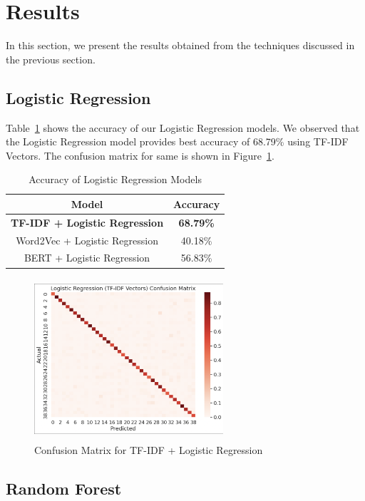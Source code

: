 \documentclass[conference]{IEEEtran}
\begin{document}
\section{Results}
In this section, we present the results obtained from the techniques discussed in the previous section.

\subsection{Logistic Regression}
Table~\ref{tab: lr_models} shows the accuracy of our Logistic Regression models. We observed that the Logistic Regression model provides best accuracy of 68.79\% using TF-IDF Vectors. The confusion matrix for same is shown in Figure~\ref{fig:lr}.

\begin{table}[!htb]
\centering
\caption{Accuracy of Logistic Regression Models}
\label{tab: lr_models}
\begin{tabular}{c|c}\midrule\midrule
Model & Accuracy\\ \midrule
\textbf{TF-IDF + Logistic Regression} & \textbf{68.79\%} \\
Word2Vec + Logistic Regression & 40.18\% \\
BERT + Logistic Regression & 56.83\% \\ \midrule\midrule
\end{tabular}
\end{table}

\begin{figure}[!htb]
\centering
\includegraphics[width=70mm, height = 60mm]{Images/Logistic Regression.png}
\caption{Confusion Matrix for TF-IDF + Logistic Regression}\label{fig:lr}
\end{figure}

\subsection{Random Forest}
\end{document}

